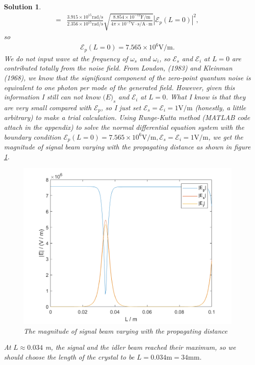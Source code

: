 \documentclass[UTF8,10pt,a4paper]{article}
\theoremstyle{Problem}
\theoremstyle{Solution}
\newtheorem*{sol}{Solution}
\providecommand{\abs}[1]{\left\lvert#1\right\rvert}
\begin{document}
\begin{sol}
\begin{align}
        =&\frac{3.915\times 10^{15}\text{rad}/\text{s}}{2.356\times 10^{15}\text{rad}/\text{s}}\sqrt{\frac{8.854\times 10^{-12}\text{F}/\text{m}}{4\pi\times 10^{-7}\text{V}\cdot\text{s}/\text{A}\cdot\text{m}}}\abs{\mathscr{E}_p(L=0)}^2,
    \end{align}
    so
    \begin{align}
        \mathscr{E}_p(L=0)=7.565\times 10^6\text{V}/\text{m}.
    \end{align}
    We do not input wave at the frequency of $\omega_s$ and $\omega_i$, so $\mathscr{E}_s$ and $\mathscr{E}_i$ at $L=0$ are contributed totally from the noise field. From Loudon, (1983) and Kleinman (1968), we know that the significant component of the zero-point quantum noise is equivalent to one photon per mode of the generated field. However, given this information I still can not know $\mathscr(E)_s$ and $\mathscr{E}_i$ at $L=0$. What I know is that they are very small compared with $\mathscr{E}_p$, so I just set $\mathscr{E}_s=\mathscr{E}_i=1\text{V}/\text{m}$ (honestly, a little arbitrary) to make a trial calculation. Using Runge-Kutta method (MATLAB code attach in the appendix) to solve the normal differential equation system with the boundary condition $\mathscr{E}_p(L=0)=7.565\times 10^6\text{V}/\text{m},\mathscr{E}_s=\mathscr{E}_i=1\text{V}/\text{m}$, we get the magnitude of signal beam varying with the propagating distance as shown in figure \ref{E-L}.
    \begin{figure}[h]
        \centering
        \includegraphics[width=.5\textwidth]{E-L.png}
        \caption{The magnitude of signal beam varying with the propagating distance}
        \label{E-L}
    \end{figure}

    At $L\approx 0.034$ m, the signal and the idler beam reached their maximum, so we should choose the length of the crystal to be $L=0.034\text{m}=34\text{mm}$.


\end{sol}
\end{document}
